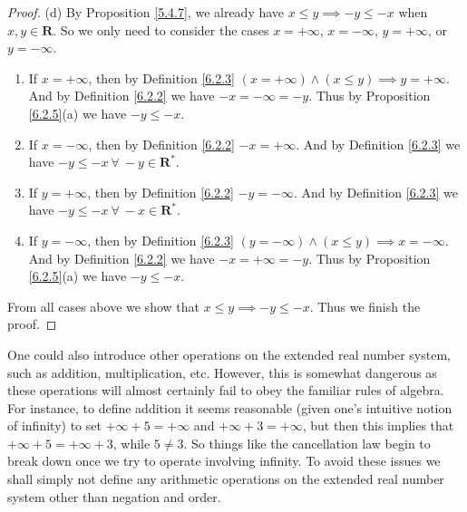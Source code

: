 \begin{proof}{(d)}
    By Proposition \ref{5.4.7}, we already have \(x \leq y \implies -y \leq -x\) when \(x, y \in \mathbf{R}\).
    So we only need to consider the cases \(x = +\infty\), \(x = -\infty\), \(y = +\infty\), or \(y = -\infty\).
    \begin{enumerate}[label=(\Roman*)]
        \item If \(x = +\infty\), then by Definition \ref{6.2.3} \((x = +\infty) \land (x \leq y) \implies y = +\infty\).
              And by Definition \ref{6.2.2} we have \(-x = -\infty = -y\).
              Thus by Proposition \ref{6.2.5}(a) we have \(-y \leq -x\).
        \item If \(x = -\infty\), then by Definition \ref{6.2.2} \(-x = +\infty\).
              And by Definition \ref{6.2.3} we have \(-y \leq -x \ \forall\ -y \in \mathbf{R}^*\).
        \item If \(y = +\infty\), then by Definition \ref{6.2.2} \(-y = -\infty\).
              And by Definition \ref{6.2.3} we have \(-y \leq -x \ \forall\ -x \in \mathbf{R}^*\).
        \item If \(y = -\infty\), then by Definition \ref{6.2.3} \((y = -\infty) \land (x \leq y) \implies x = -\infty\).
              And by Definition \ref{6.2.2} we have \(-x = +\infty = -y\).
              Thus by Proposition \ref{6.2.5}(a) we have \(-y \leq -x\).
    \end{enumerate}
    From all cases above we show that \(x \leq y \implies -y \leq -x\).
    Thus we finish the proof.
\end{proof}

\begin{note}
    One could also introduce other operations on the extended real number system, such as addition, multiplication, etc.
    However, this is somewhat dangerous as these operations will almost certainly fail to obey the familiar rules of algebra.
    For instance, to define addition it seems reasonable (given one’s intuitive notion of infinity) to set \(+\infty + 5 = +\infty\) and \(+\infty + 3 = +\infty\), but then this implies that \(+\infty + 5 = +\infty + 3\), while \(5 \neq 3\).
    So things like the cancellation law begin to break down once we try to operate involving infinity.
    To avoid these issues we shall simply not define any arithmetic operations on the extended real number system other than negation and order.
\end{note}

